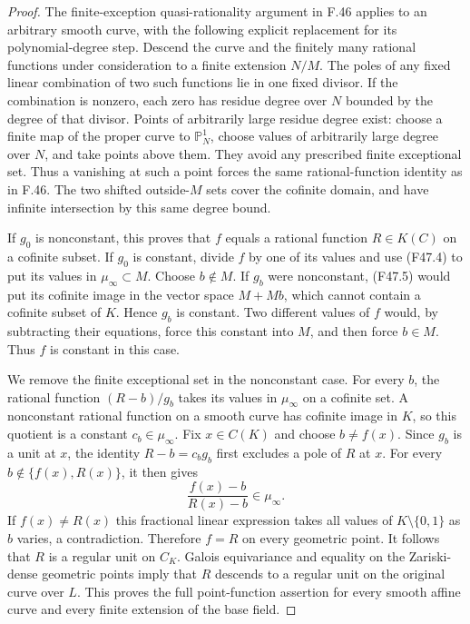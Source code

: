 \begin{proof}
The finite-exception quasi-rationality argument in F.46 applies to
an arbitrary smooth curve, with the following explicit replacement
for its polynomial-degree step. Descend the curve and the finitely
many rational functions under consideration to a finite extension
$N/M$. The poles of any fixed linear combination of two such
functions lie in one fixed divisor. If the combination is nonzero,
each zero has residue degree over $N$ bounded by the degree of that
divisor. Points of arbitrarily large residue degree exist: choose a
finite map of the proper curve to $\mathbb P^1_N$, choose values of
arbitrarily large degree over $N$, and take points above them.
They avoid any prescribed finite exceptional set. Thus a vanishing
at such a point forces the same rational-function identity as in
F.46. The two shifted outside-$M$ sets cover the cofinite domain,
and have infinite intersection by this same degree bound.

If $g_0$ is nonconstant, this proves that $f$ equals a rational
function $R\in K(C)$ on a cofinite subset. If $g_0$ is constant,
divide $f$ by one of its values and use (F47.4) to put its values
in $\mu_\infty\subset M$. Choose $b\notin M$. If $g_b$ were
nonconstant, (F47.5) would put its cofinite image in the vector
space $M+Mb$, which cannot contain a cofinite subset of $K$.
Hence $g_b$ is constant. Two different values of $f$ would, by
subtracting their equations, force this constant into $M$, and
then force $b\in M$. Thus $f$ is constant in this case.

We remove the finite exceptional set in the nonconstant case.
For every $b$, the rational function $(R-b)/g_b$ takes its values
in $\mu_\infty$ on a cofinite set. A nonconstant rational function
on a smooth curve has cofinite image in $K$, so this quotient is a
constant $c_b\in\mu_\infty$. Fix $x\in C(K)$ and choose
$b\ne f(x)$. Since $g_b$ is a unit at $x$, the identity
$R-b=c_b g_b$ first excludes a pole of $R$ at $x$. For every
$b\notin\{f(x),R(x)\}$, it then gives
\[
 \frac{f(x)-b}{R(x)-b}\in\mu_\infty.
\]
If $f(x)\ne R(x)$ this fractional linear expression takes all
values of $K\setminus\{0,1\}$ as $b$ varies, a contradiction.
Therefore $f=R$ on every geometric point. It follows that $R$ is
a regular unit on $C_K$. Galois equivariance and equality on the
Zariski-dense geometric points imply that $R$ descends to a regular
unit on the original curve over $L$. This proves the full
point-function assertion for every smooth affine curve and every
finite extension of the base field.


\end{proof}
